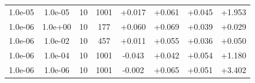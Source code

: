 \documentclass[11pt,a4paper]{article}
\begin{document}
\begin{table}[t]
{\begin{tabular}{*{8}c}
\rowcolor{red} 1.0e-05 	 & 1.0e-05 	 & 10 & 1001 	 & +0.017 & +0.061 & +0.045 & +1.953 \\ 
 1.0e-06 	 & 1.0e+00 	 & 10 & 177 	 & +0.060 & +0.069 & +0.039 & +0.029 \\ 
 1.0e-06 	 & 1.0e-02 	 & 10 & 457 	 & +0.011 & +0.055 & +0.036 & +0.050 \\ 
\rowcolor{red}  1.0e-06 	 & 1.0e-04 	 & 10 & 1001 	 & -0.043 & +0.042 & +0.054 & +1.180 \\ 
\rowcolor{red}  1.0e-06 	 & 1.0e-06 	 & 10 & 1001 	 & -0.002 & +0.065 & +0.051 & +3.402 \\ 
\end{tabular}}
\label{Tab::Noise0.3}
\end{table} 
\end{document}
